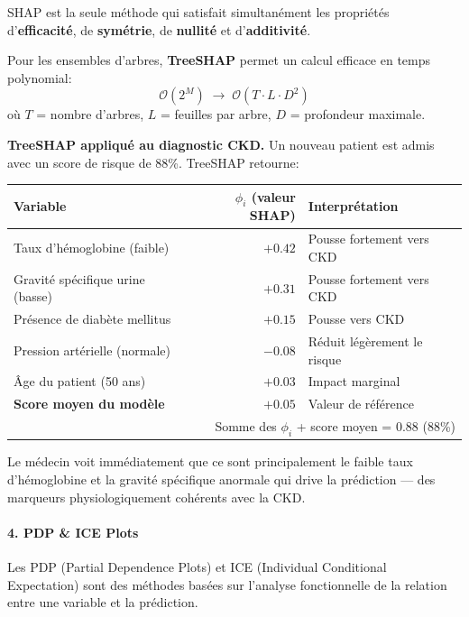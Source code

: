 \begin{pointcle}
SHAP est la seule méthode qui satisfait simultanément les propriétés d'\textbf{efficacité}, de \textbf{symétrie}, de \textbf{nullité} et d'\textbf{additivité}.
\end{pointcle}

Pour les ensembles d'arbres, \textbf{TreeSHAP} permet un calcul efficace en temps polynomial:
\[
\mathcal{O}(2^M) \;\longrightarrow\; \mathcal{O}(T \cdot L \cdot D^2)
\]
où $T$ = nombre d'arbres, $L$ = feuilles par arbre, $D$ = profondeur maximale.

\textbf{TreeSHAP appliqué au diagnostic CKD.}
Un nouveau patient est admis avec un score de risque de 88\%. TreeSHAP retourne:

\vspace{4pt}
\begin{center}
\begin{tabular}{lrl}
\toprule
Variable & $\phi_i$ (valeur SHAP) & Interprétation \\
\midrule
Taux d'hémoglobine (faible) & $+0.42$ & Pousse fortement vers CKD \\
Gravité spécifique urine (basse) & $+0.31$ & Pousse fortement vers CKD \\
Présence de diabète mellitus & $+0.15$ & Pousse vers CKD \\
Pression artérielle (normale) & $-0.08$ & Réduit légèrement le risque \\
Âge du patient (50 ans) & $+0.03$ & Impact marginal \\
\midrule
\textbf{Score moyen du modèle} & $+0.05$ & Valeur de référence \\
\bottomrule
\multicolumn{3}{r}{\small Somme des $\phi_i$ + score moyen = 0.88 (88\%)} \\
\end{tabular}
\end{center}

\vspace{4pt}
Le médecin voit immédiatement que ce sont principalement le faible taux d'hémoglobine et la gravité spécifique anormale qui drive la prédiction --- des marqueurs physiologiquement cohérents avec la CKD.

\paragraph{4. PDP \& ICE Plots}

Les PDP (Partial Dependence Plots) et ICE (Individual Conditional Expectation) sont des méthodes basées sur l'analyse fonctionnelle de la relation entre une variable et la prédiction.

